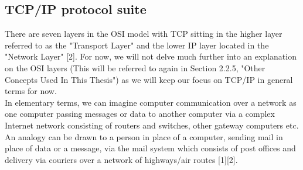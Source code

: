 \documentclass{uathesis}
\begin{document}
\subsection{TCP/IP protocol suite}
There are seven layers in the OSI model with TCP sitting in the higher layer referred to as the "Transport Layer" and the lower IP layer located in the "Network Layer" [2]. For now, we will not delve much further into an explanation on the OSI layers (This will be referred to again in Section 2.2.5, "Other Concepts Used In This Thesis") as we will keep our focus on TCP/IP in general terms for now. \\

In elementary terms, we can imagine computer communication over a network as one computer passing messages or data to another computer via a complex Internet network consisting of routers and switches, other gateway computers etc. An analogy can be drawn to a person in place of a computer, sending mail in place of data or a message, via the mail system which consists of post offices and delivery via couriers over a network of highways/air routes [1][2]. \\
\end{document}
